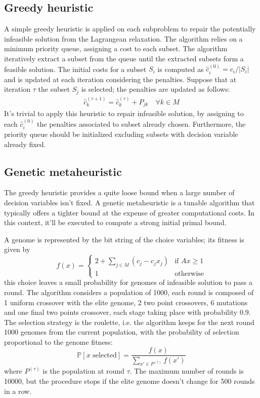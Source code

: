 \documentclass[a4paper]{article}
\begin{document}
\subsection{Greedy heuristic}
A simple greedy heuristic is applied on each subproblem to repair the potentially infeasible solution from the Lagrangean relaxation. The algorithm relies on a minimum priority queue, assigning a cost to each subset. The algorithm iteratively extract a subset from the queue until the extracted subsets form a feasible solution. The initial costs for a subset $S_i$ is computed as $\hat c_i^{(0)} = c_i/|S_i|$ and is updated at each iteration considering the penalties. Suppose that at iteration $\tau$ the subset $S_j$ is selected; the penalties are updated as follows:
\begin{align*}
	\hat c_k^{(\tau+1)} = \hat c_k^{(\tau)} + P_{jk} \quad \forall k \in M	
\end{align*}
It's trivial to apply this heuristic to repair infeasible solution, by assigning to each $\hat c_i^{(0)}$ the penalties associated to subset already chosen. Furthermore, the priority queue should be initialized excluding subsets with decision variable already fixed.

\subsection{Genetic metaheuristic}
The greedy heuristic provides a quite loose bound when a large number of decision variables isn't fixed. A genetic metaheuristic is a tunable algorithm that typically offers a tighter bound at the expense of greater computational costs. In this context, it'll be executed to compute a strong initial primal bound.

A genome is represented by the bit string of the choice variables; its fitness is given by
$$
f(x) = 
\begin{cases}
	2 + \sum_{j\in M} (c_j - c_j x_j) & \text{if } Ax \geq 1\\
	1 & \text{otherwise}
\end{cases}
$$
this choice leaves a small probability for genomes of infeasible solution to pass a round. The algorithm considers a population of 1000, each round is composed of 1 uniform crossover with the elite genome, 2 two point crossovers, 6 mutations and one final two points crossover, each stage taking place with probability 0.9. The selection strategy is the roulette, i.e. the algorithm keeps for the next round 1000 genomes from the current population, with the probability of selection proportional to the genome fitness:
$$
\mathbb{P}[x \text{ selected}] = \frac{f(x)}{\sum_{x' \in P^{(\tau)}}f(x')}
$$
where $P^{(\tau)}$ is the population at round $\tau$.
The maximum number of rounds is 10000, but the procedure stops if the elite genome doesn't change for 500 rounds in a row.
\end{document}
